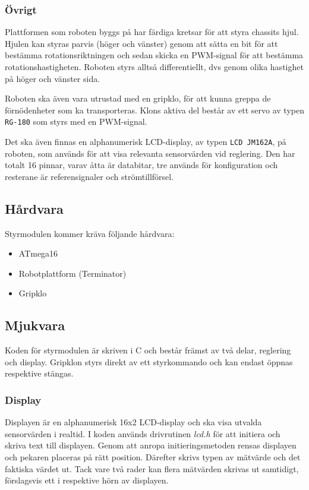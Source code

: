 \documentclass[11pt]{article}
\begin{document}
\begin{flushleft}
\subsubsection{Övrigt}
Plattformen som roboten byggs på har färdiga kretsar för att styra chassits hjul. Hjulen kan styras parvis (höger och vänster) genom att sätta en bit för att bestämma rotationsriktningen och sedan skicka en PWM-signal för att bestämma rotationshastigheten. Roboten styrs alltså differentiellt, dvs genom olika hastighet på höger och vänster sida.

Roboten ska även vara utrustad med en gripklo, för att kunna greppa de förnödenheter som ka transporteras. Klons aktiva del består av ett servo av typen \verb+RG-180+ som styrs med en PWM-signal.

Det ska även finnas en alphanumerisk LCD-display, av typen \verb+LCD JM162A+, på roboten, som används för att visa relevanta sensorvärden vid reglering. Den har totalt 16 pinnar, varav åtta är databitar, tre används för konfiguration och resterane är referensignaler och strömtillförsel.

\subsection{Hårdvara}
Styrmodulen kommer kräva följande hårdvara:
\begin{itemize}
	\item ATmega16
	\item Robotplattform (Terminator)
	\item Gripklo %
\end{itemize}

\subsection{Mjukvara}
Koden för styrmodulen är skriven i C och består främst av två delar, reglering och display. Gripklon styrs direkt av ett styrkommando och kan endast öppnas respektive stängas.

\subsubsection{Display}
Displayen är en alphanumerisk 16x2 LCD-display och ska visa utvalda sensorvärden i realtid. I koden används drivrutinen \emph{lcd.h} för att initiera och skriva text till displayen. Genom att anropa initieringsmetoden rensas displayen och pekaren placeras på rätt position. Därefter skrivs typen av mätvärde och det faktiska värdet ut. Tack vare två rader kan flera mätvärden skrivas ut samtidigt, förslagsvis ett i respektive hörn av displayen.


\end{flushleft}
\end{document}
